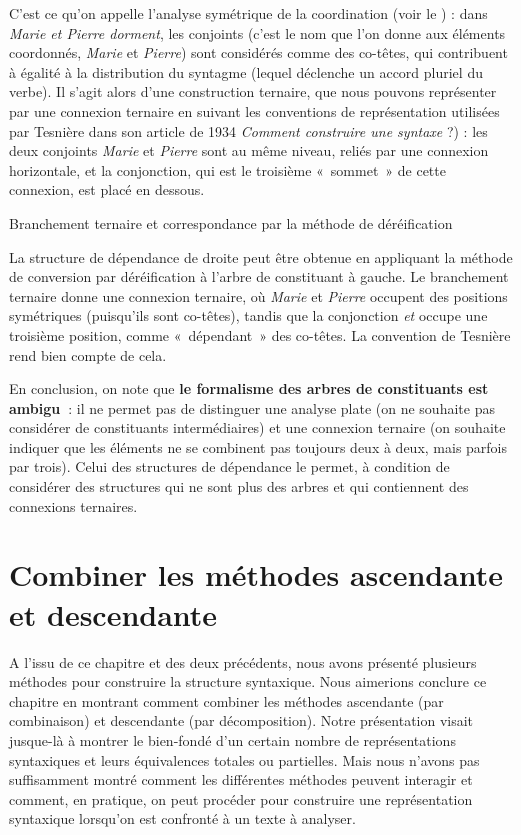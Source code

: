 {    C’est ce qu’on appelle l’analyse symétrique de la coordination (voir le ) : dans \textit{Marie et Pierre dorment}, les conjoints (c’est le nom que l’on donne aux éléments coordonnés, \textit{Marie} et \textit{Pierre}) sont considérés comme des co-têtes, qui contribuent à égalité à la distribution du syntagme (lequel déclenche un accord pluriel du verbe). Il s’agit alors d’une construction ternaire, que nous pouvons représenter par une connexion ternaire en suivant les conventions de représentation utilisées par Tesnière dans son article de 1934 \textit{Comment construire une syntaxe} ?) : les deux conjoints \textit{Marie} et \textit{Pierre} sont au même niveau, reliés par une connexion horizontale, et la conjonction, qui est le troisième «~sommet~» de cette connexion, est placé en dessous.

    \ea

    Branchement ternaire et correspondance par la méthode de déréification
    \z

    La structure de dépendance de droite peut être obtenue en appliquant la méthode de conversion par déréification à l’arbre de constituant à gauche. Le branchement ternaire donne une connexion ternaire, où \textit{Marie} et \textit{Pierre} occupent des positions symétriques (puisqu’ils sont co-têtes), tandis que la conjonction \textit{et} occupe une troisième position, comme «~dépendant~» des co-têtes. La convention de Tesnière rend bien compte de cela.

    En conclusion, on note que \textbf{le formalisme des arbres de constituants est ambigu~}: il ne permet pas de distinguer une analyse plate (on ne souhaite pas considérer de constituants intermédiaires) et une connexion ternaire (on souhaite indiquer que les éléments ne se combinent pas toujours deux à deux, mais parfois par trois). Celui des structures de dépendance le permet, à condition de considérer des structures qui ne sont plus des arbres et qui contiennent des connexions ternaires.
}
\section{Combiner les méthodes ascendante et descendante}\label{sec:3.4.27}

A l’issu de ce chapitre et des deux précédents, nous avons présenté plusieurs méthodes pour construire la structure syntaxique. Nous aimerions conclure ce chapitre en montrant comment combiner les méthodes ascendante (par combinaison) et descendante (par décomposition). Notre présentation visait jusque-là à montrer le bien-fondé d’un certain nombre de représentations syntaxiques et leurs équivalences totales ou partielles. Mais nous n’avons pas suffisamment montré comment les différentes méthodes peuvent interagir et comment, en pratique, on peut procéder pour construire une représentation syntaxique lorsqu’on est confronté à un texte à analyser.


